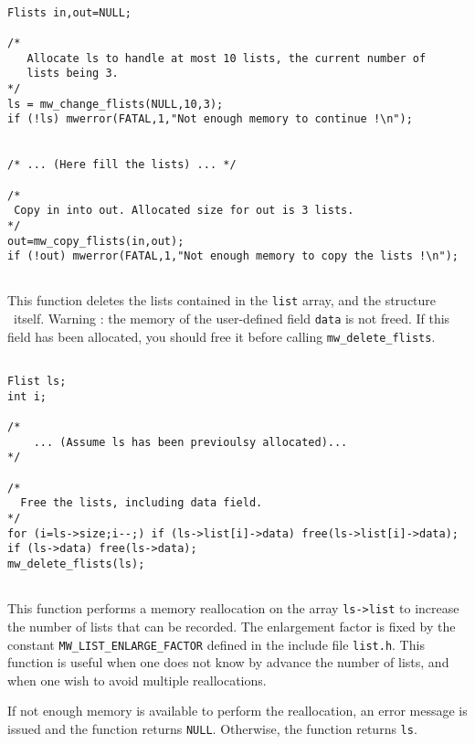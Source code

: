 \Next
\Example
\begin{verbatim}

Flists in,out=NULL;

/* 
   Allocate ls to handle at most 10 lists, the current number of
   lists being 3.
*/
ls = mw_change_flists(NULL,10,3);
if (!ls) mwerror(FATAL,1,"Not enough memory to continue !\n");


/* ... (Here fill the lists) ... */

/*
 Copy in into out. Allocated size for out is 3 lists.
*/
out=mw_copy_flists(in,out);
if (!out) mwerror(FATAL,1,"Not enough memory to copy the lists !\n");


\end{verbatim}

\newpage %


\Description
This function deletes the lists contained in the \verb+list+ array,
and the structure \flists\ itself.
Warning : the memory of the user-defined field \verb+data+ is not freed.
If this field has been allocated, you should free it before calling
\verb+mw_delete_flists+.

\Next
\Example
\begin{verbatim}

Flist ls;
int i;

/*
    ... (Assume ls has been previoulsy allocated)...
*/

/* 
  Free the lists, including data field. 
*/
for (i=ls->size;i--;) if (ls->list[i]->data) free(ls->list[i]->data);
if (ls->data) free(ls->data);
mw_delete_flists(ls);


\end{verbatim}

\newpage %
\Description
This function performs a memory reallocation on the array
\verb+ls->list+ to increase the number of lists that can be recorded.
The enlargement factor is fixed by the constant \verb+MW_LIST_ENLARGE_FACTOR+
defined in the include file \verb+list.h+.
This function is useful when one does not know by advance the number
of lists, and when one wish to avoid multiple reallocations.

If not enough memory is available to perform the reallocation, an error
message is issued and the function returns \verb+NULL+.
Otherwise, the function returns \verb+ls+.


